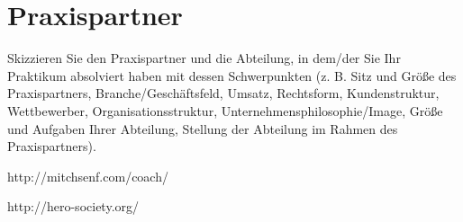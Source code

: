 
\chapter{Praxispartner}

Skizzieren Sie den Praxispartner und die Abteilung, in dem/der Sie Ihr Praktikum absolviert haben mit dessen Schwerpunkten (z. B. Sitz und Größe des Praxispartners, Branche/Geschäftsfeld, Umsatz, Rechtsform, Kundenstruktur, Wettbewerber, Organisationsstruktur, Unternehmensphilosophie/Image, Größe und Aufgaben Ihrer Abteilung, Stellung der Abteilung im Rahmen des Praxispartners).

http://mitchsenf.com/coach/

http://hero-society.org/
